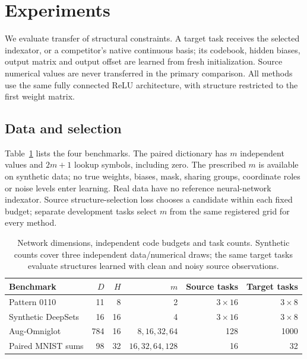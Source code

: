 \section{Experiments}
\label{sec:experiments}

We evaluate transfer of structural constraints. A target task receives
the selected indexator, or a competitor's native continuous basis;
its codebook, hidden biases, output matrix and output offset are learned
from fresh initialization. Source numerical values are never transferred
in the primary comparison. All methods use the same fully connected
ReLU architecture, with structure restricted to the first weight matrix.

\subsection{Data and selection}

Table~\ref{tab:benchmark-settings} lists the four benchmarks.
The paired dictionary has $m$ independent values and $2m+1$ lookup
symbols, including zero. The prescribed $m$ is available on synthetic
data; no true weights, biases, mask, sharing groups, coordinate roles or
noise levels enter learning. Real data have no reference neural-network
indexator. Source structure-selection loss chooses a candidate within
each fixed budget; separate development tasks select $m$ from the same
registered grid for every method.

\begin{table}[htbp]
    \centering
    \small
    \begin{tabular}{lrrrrr}
        \toprule
        Benchmark & $D$ & $H$ & $m$ & Source tasks & Target tasks\\
        \midrule
        Pattern 0110 & 11 & 8 & 2 & $3\times16$ & $3\times8$\\
        Synthetic DeepSets & 16 & 16 & 4 & $3\times16$ & $3\times8$\\
        Aug-Omniglot & 784 & 16 & $8,16,32,64$ & 128 & 1000\\
        Paired MNIST sums & 98 & 32 & $16,32,64,128$ & 16 & 32\\
        \bottomrule
    \end{tabular}
    \caption{Network dimensions, independent code budgets and task counts.
        Synthetic counts cover three independent data/numerical draws;
        the same target tasks evaluate structures learned with clean and
        noisy source observations.}
    \label{tab:benchmark-settings}
\end{table}

